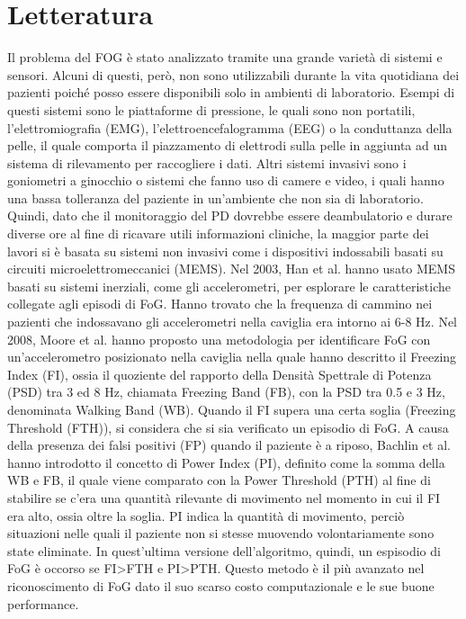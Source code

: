 

\chapter{Letteratura}\label{chap2:related}
Il problema del FOG è stato analizzato tramite una grande varietà di sistemi e sensori. Alcuni di questi, però, non sono utilizzabili durante la vita quotidiana dei pazienti poiché posso essere disponibili solo in ambienti di laboratorio. Esempi di questi sistemi sono le piattaforme di pressione\cite{38}, le quali sono non portatili, l'elettromiografia (EMG)\cite{25}, l'elettroencefalogramma (EEG)\cite{42} o la conduttanza della pelle\cite{43}, il quale comporta il piazzamento di elettrodi sulla pelle in aggiunta ad un sistema di rilevamento per raccogliere i dati.
Altri sistemi invasivi sono i goniometri a ginocchio\cite{23} o sistemi che fanno uso di camere e video, i quali hanno una bassa tolleranza del paziente in un'ambiente che non sia di laboratorio\cite{23,39,44}. Quindi, dato che il monitoraggio del PD dovrebbe essere deambulatorio e  durare diverse ore al fine di ricavare utili informazioni cliniche\cite{34,45}, la maggior parte dei lavori si è basata su sistemi non invasivi come i dispositivi indossabili basati su circuiti microelettromeccanici (MEMS). \newline
Nel 2003, Han et al. hanno usato MEMS basati su sistemi inerziali, come gli accelerometri, per esplorare le caratteristiche collegate agli episodi di FoG. Hanno trovato che la frequenza di cammino nei pazienti che indossavano gli accelerometri nella caviglia era intorno ai 6-8 Hz\cite{19}. Nel 2008, Moore et al. hanno proposto una metodologia per identificare FoG con un'accelerometro posizionato nella caviglia nella quale hanno descritto il Freezing Index (FI), ossia il quoziente del rapporto della Densità Spettrale di Potenza (PSD) tra 3 ed 8 Hz, chiamata Freezing Band (FB), con la PSD tra 0.5 e 3 Hz, denominata Walking Band (WB)\cite{21}. Quando il FI supera una certa soglia (Freezing Threshold (FTH)), si considera che si sia verificato un episodio di FoG. A causa della presenza dei falsi positivi (FP) quando il paziente è a riposo, Bachlin et al. hanno introdotto il concetto di Power Index (PI), definito come la somma della WB e FB, il quale viene comparato con la Power Threshold (PTH) al fine di stabilire se c'era una quantità rilevante di movimento nel momento in cui il FI era alto, ossia oltre la soglia\cite{21}. PI indica la quantità di movimento, perciò situazioni nelle quali il paziente non si stesse muovendo volontariamente sono state eliminate. In quest'ultima versione dell'algoritmo, quindi, un espisodio di FoG è occorso se FI>FTH e PI>PTH. Questo metodo è il più avanzato nel riconoscimento di FoG dato il suo scarso costo computazionale e le sue buone performance\cite{22}. \newline
